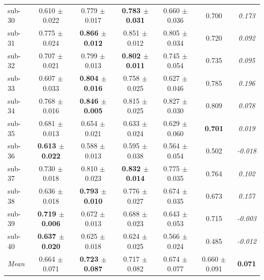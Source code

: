 \begin{table}[t]
\begin{tabular}{lcccccc}
sub-30 & 0.610 $\pm$ 0.022 & 0.779 $\pm$ 0.017 & \textbf{0.783 $\pm$ 0.031} & 0.660 $\pm$ 0.036 & 0.700 & \textit{0.173} \\
sub-31 & 0.775 $\pm$ 0.024 & \textbf{0.866 $\pm$ 0.012} & 0.851 $\pm$ 0.012 & 0.805 $\pm$ 0.034 & 0.720 & \textit{0.092} \\
sub-32 & 0.707 $\pm$ 0.021 & 0.799 $\pm$ 0.013 & \textbf{0.802 $\pm$ 0.011} & 0.745 $\pm$ 0.054 & 0.735 & \textit{0.095} \\
sub-33 & 0.607 $\pm$ 0.033 & \textbf{0.804 $\pm$ 0.016} & 0.758 $\pm$ 0.025 & 0.627 $\pm$ 0.046 & 0.785 & \textit{0.196} \\
sub-34 & 0.768 $\pm$ 0.016 & \textbf{0.846 $\pm$ 0.005} & 0.815 $\pm$ 0.025 & 0.827 $\pm$ 0.030 & 0.809 & \textit{0.078} \\
sub-35 & 0.681 $\pm$ 0.013 & 0.654 $\pm$ 0.021 & 0.633 $\pm$ 0.024 & 0.629 $\pm$ 0.060 & \textbf{0.701} & \textit{0.019} \\
sub-36 & \textbf{0.613 $\pm$ 0.022} & 0.588 $\pm$ 0.013 & 0.595 $\pm$ 0.038 & 0.564 $\pm$ 0.054 & 0.502 & \textit{-0.018} \\
sub-37 & 0.730 $\pm$ 0.018 & 0.810 $\pm$ 0.023 & \textbf{0.832 $\pm$ 0.014} & 0.775 $\pm$ 0.035 & 0.764 & \textit{0.102} \\
sub-38 & 0.636 $\pm$ 0.018 & \textbf{0.793 $\pm$ 0.010} & 0.776 $\pm$ 0.027 & 0.674 $\pm$ 0.035 & 0.673 & \textit{0.157} \\
sub-39 & \textbf{0.719 $\pm$ 0.006} & 0.672 $\pm$ 0.013 & 0.688 $\pm$ 0.023 & 0.643 $\pm$ 0.053 & 0.715 & \textit{-0.003} \\
sub-40 & \textbf{0.637 $\pm$ 0.020} & 0.625 $\pm$ 0.018 & 0.624 $\pm$ 0.025 & 0.566 $\pm$ 0.024 & 0.485 & \textit{-0.012} \\
\midrule
\textit{Mean} & 0.664 $\pm$ 0.071 & \textbf{0.723 $\pm$ 0.087} & 0.717 $\pm$ 0.082 & 0.674 $\pm$ 0.077 & 0.660 $\pm$ 0.091 & \textbf{0.071} \\
\bottomrule
\end{tabular}
\end{table}

